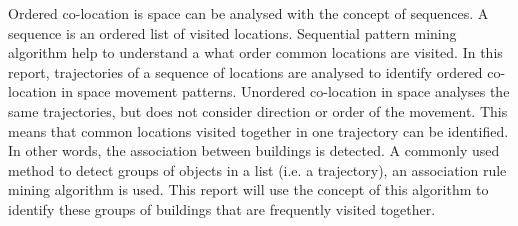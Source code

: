 Ordered co-location is space can be analysed with the concept of sequences. A sequence is an ordered list of visited locations. Sequential pattern mining algorithm help to understand a what order common locations are visited. In this report, trajectories of a sequence of locations are analysed to identify ordered co-location in space movement patterns.
Unordered co-location in space analyses the same trajectories, but does not consider direction or order of the movement. This means that common locations visited together in one trajectory can be identified. In other words, the association between buildings is detected. A commonly used method to detect groups of objects in a list (i.e. a trajectory), an association rule mining algorithm is used. This report will use the concept of this algorithm to identify these groups of buildings that are frequently visited together.
